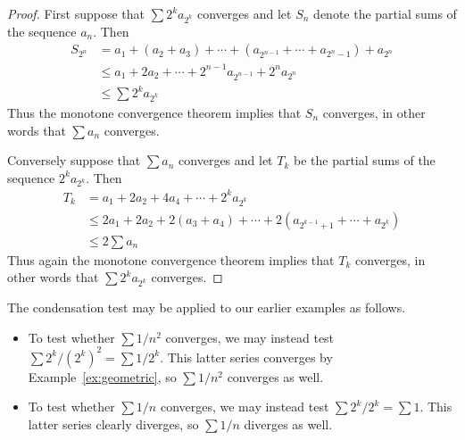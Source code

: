 \documentclass[11pt,oneside]{amsbook}
\theoremstyle{definition}
\theoremstyle{plain}
\theoremstyle{definition}
\theoremstyle{remark}
\newtheorem{example}[thm]{Example}
\numberwithin{equation}{section}
\numberwithin{figure}{section}
\begin{document}

\begin{proof}
  First suppose that $\sum2^ka_{2^k}$ converges and let $S_n$ denote the partial sums of the sequence $a_n$. Then
  \begin{align*}
    S_{2^n}&=a_1+(a_2+a_3)+\cdots+(a_{2^{n-1}}+\cdots+a_{2^n-1})+a_{2^n}\\
           &\leq a_1+2a_2+\cdots+2^{n-1}a_{2^{n-1}}+2^na_{2^n}\\
           &\leq\sum2^ka_{2^k}
  \end{align*}
  Thus the monotone convergence theorem implies that $S_n$ converges, in other words that $\sum a_n$ converges.

  Conversely suppose that $\sum a_n$ converges and let $T_k$ be the partial sums of the sequence $2^ka_{2^k}$. Then
  \begin{align*}
    T_k&=a_1+2a_2+4a_4+\cdots+2^ka_{2^k}\\
       &\leq 2a_1+2a_2+2(a_3+a_4)+\cdots+2(a_{2^{k-1}+1}+\cdots+a_{2^k})\\
       &\leq 2\sum a_n
  \end{align*}
  Thus again the monotone convergence theorem implies that $T_k$ converges, in other words that $\sum2^ka_{2^k}$ converges.
\end{proof}

The condensation test may be applied to our earlier examples as follows.
\begin{itemize}
\item To test whether $\sum1/n^2$ converges, we may instead test $\sum2^k/(2^k)^2=\sum1/2^k$. This latter series converges by Example~\ref{ex:geometric}, so $\sum1/n^2$ converges as well.
\item To test whether $\sum1/n$ converges, we may instead test $\sum2^k/2^k=\sum1$. This latter series clearly diverges, so $\sum1/n$ diverges as well.
\end{itemize}


\end{document}
